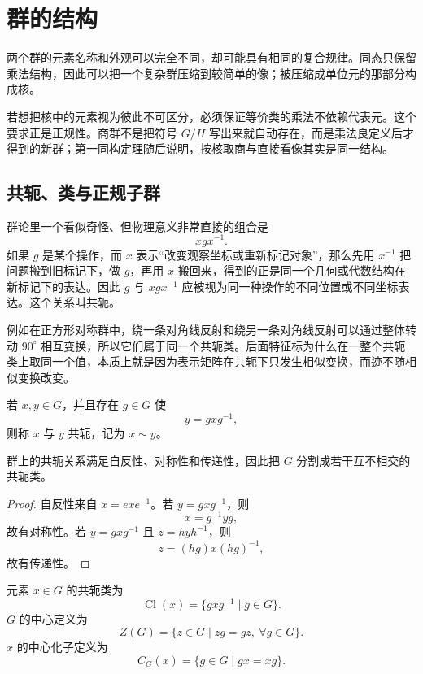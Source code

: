 \chapter{群的结构}
\label{chap:homomorphism-quotient}

两个群的元素名称和外观可以完全不同，却可能具有相同的复合规律。同态只保留乘法结构，因此可以把一个复杂群压缩到较简单的像；被压缩成单位元的那部分构成核。

若想把核中的元素视为彼此不可区分，必须保证等价类的乘法不依赖代表元。这个要求正是正规性。商群不是把符号 $G/H$ 写出来就自动存在，而是乘法良定义后才得到的新群；第一同构定理随后说明，按核取商与直接看像其实是同一结构。

\section{共轭、类与正规子群}
\label{sec:conjugacy-normal}

群论里一个看似奇怪、但物理意义非常直接的组合是
\[
xgx^{-1}.
\]
如果 $g$ 是某个操作，而 $x$ 表示“改变观察坐标或重新标记对象”，那么先用 $x^{-1}$ 把问题搬到旧标记下，做 $g$，再用 $x$ 搬回来，得到的正是同一个几何或代数结构在新标记下的表达。因此 $g$ 与 $xgx^{-1}$ 应被视为同一种操作的不同位置或不同坐标表达。这个关系叫共轭。

例如在正方形对称群中，绕一条对角线反射和绕另一条对角线反射可以通过整体转动 $90^\circ$ 相互变换，所以它们属于同一个共轭类。后面特征标为什么在一整个共轭类上取同一个值，本质上就是因为表示矩阵在共轭下只发生相似变换，而迹不随相似变换改变。


\begin{definition}[共轭]
若 $x,y\in G$，并且存在 $g\in G$ 使
\[
y=gxg^{-1},
\]
则称 $x$ 与 $y$ 共轭，记为 $x\sim y$。
\label{def:conjugacy}
\end{definition}

\begin{proposition}[共轭是等价关系]
群上的共轭关系满足自反性、对称性和传递性，因此把 $G$ 分割成若干互不相交的共轭类。
\label{prop:conjugacy-equivalence}

\end{proposition}

\begin{proof}
自反性来自 $x=exe^{-1}$。若 $y=gxg^{-1}$，则
\[
x=g^{-1}yg,
\]
故有对称性。若 $y=gxg^{-1}$ 且 $z=hyh^{-1}$，则
\[
z=(hg)x(hg)^{-1},
\]
故有传递性。
\end{proof}

\begin{definition}
元素 $x\in G$ 的共轭类为
\[
\operatorname{Cl}(x)=\{gxg^{-1}\mid g\in G\}.
\]
$G$ 的中心定义为
\[
Z(G)=\{z\in G\mid zg=gz,\ \forall g\in G\}.
\]
$x$ 的中心化子定义为
\[
C_G(x)=\{g\in G\mid gx=xg\}.
\]
\label{def:center-centralizer}
\end{definition}

